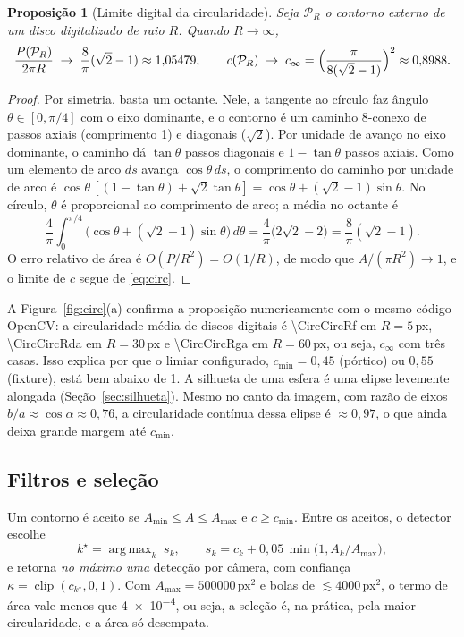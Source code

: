 \documentclass[11pt,a4paper]{article}
\newtheorem{proposicao}{Proposição}
\theoremstyle{definition}
\theoremstyle{remark}
\DeclareMathOperator*{\argmax}{arg\,max}
\begin{document}
\begin{proposicao}[Limite digital da circularidade]
\label{prop:circ-digital}
Seja $\mathcal P_R$ o contorno externo de um disco digitalizado de raio $R$.
Quando $R\to\infty$,
\begin{equation}
\frac{P(\mathcal P_R)}{2\pi R}\;\to\;\frac{8}{\pi}(\sqrt2-1)\approx1{,}05479,
\qquad
c(\mathcal P_R)\;\to\;c_\infty=\Bigl(\frac{\pi}{8(\sqrt2-1)}\Bigr)^2\approx0{,}8988.
\end{equation}
\end{proposicao}
\begin{proof}
Por simetria, basta um octante. Nele, a tangente ao círculo faz ângulo
$\theta\in[0,\pi/4]$ com o eixo dominante, e o contorno é um caminho 8-conexo
de passos axiais (comprimento 1) e diagonais ($\sqrt2$). Por unidade de avanço
no eixo dominante, o caminho dá $\tan\theta$ passos diagonais e $1-\tan\theta$
passos axiais. Como um elemento de arco $ds$ avança $\cos\theta\,ds$, o
comprimento do caminho por unidade de arco é
$\cos\theta\,[(1-\tan\theta)+\sqrt2\tan\theta]=\cos\theta+(\sqrt2-1)\sin\theta$.
No círculo, $\theta$ é proporcional ao comprimento de arco; a média no
octante é
\[
\frac{4}{\pi}\int_0^{\pi/4}\bigl(\cos\theta+(\sqrt2-1)\sin\theta\bigr)\,d\theta
=\frac4\pi\bigl(2\sqrt2-2\bigr)=\frac{8}{\pi}(\sqrt2-1).
\]
O erro relativo de área é $O(P/R^2)=O(1/R)$, de modo que
$A/(\pi R^2)\to1$, e o limite de $c$ segue de \eqref{eq:circ}.
\end{proof}

A Figura~\ref{fig:circ}(a) confirma a proposição numericamente com o mesmo
código OpenCV: a circularidade média de discos digitais é \num{\CircCircRf} em
$R=5$\,px, \num{\CircCircRda} em $R=30$\,px e \num{\CircCircRga} em
$R=60$\,px, ou seja, $c_\infty$ com três casas. Isso explica por que o
limiar configurado, $c_{\min}=0{,}45$ (pórtico) ou $0{,}55$ (fixture), está
bem abaixo de 1. A silhueta de uma esfera é uma elipse levemente alongada
(Seção~\ref{sec:silhueta}). Mesmo no canto da imagem, com razão de eixos
$b/a\approx\cos\alpha\approx0{,}76$, a circularidade contínua dessa elipse é
$\approx0{,}97$, o que ainda deixa grande margem até $c_{\min}$.

\subsection{Filtros e seleção}

Um contorno é aceito se $A_{\min}\leq A\leq A_{\max}$ e $c\geq c_{\min}$. Entre
os aceitos, o detector escolhe
\begin{equation}
k^\star=\argmax_k\; s_k,\qquad s_k=c_k+0{,}05\,\min\bigl(1,A_k/A_{\max}\bigr),
\label{eq:score}
\end{equation}
e retorna \emph{no máximo uma} detecção por câmera, com confiança
$\kappa=\operatorname{clip}(c_{k^\star},0,1)$. Com $A_{\max}=\num{500000}$\,px$^2$
e bolas de $\lesssim\num{4000}$\,px$^2$, o termo de área vale menos que
\num{4e-4}, ou seja, a seleção é, na prática, pela maior circularidade, e a
área só desempata.
\end{document}
